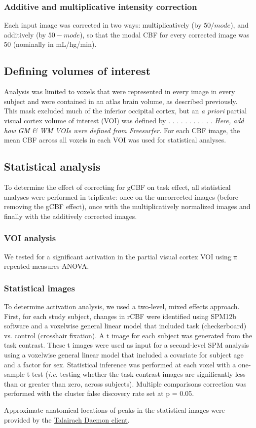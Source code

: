 \subsubsection{Additive and multiplicative intensity correction}
Each input image was corrected in two ways: multiplicatively (by $50/mode$), and additively (by $50-mode$), so that the modal CBF for every corrected image was 50 (nominally in mL/hg/min).

\subsection{Defining volumes of interest}
Analysis was limited to voxels that were represented in every image in every subject and were contained in an atlas brain volume, as described previously.\cite{Black_2010} This mask excluded much of the inferior occipital cortex, but an \textit{a priori} partial visual cortex volume of interest (VOI) was defined by . . . . . . . . . . .  \textit{Here, add how GM & WM VOIs were defined from Freesurfer.} For each CBF image, the mean CBF across all voxels in each VOI was used for statistical analyses.

\subsection{Statistical analysis}
To determine the effect of correcting for gCBF on task effect, all statistical analyses were performed in triplicate: once on the uncorrected images (before removing the gCBF effect), once with the multiplicatively normalized images and finally with the additively corrected images.

\subsubsection{VOI analysis}
We tested for a significant activation in the partial visual cortex VOI using \sout{a repeated measures ANOVA}.

\subsubsection{Statistical images}
To determine activation analysis, we used a two-level, mixed effects approach.  First, for each study subject, changes in rCBF were identified using SPM12b software and a voxelwise general linear model that included task (checkerboard) vs. control (crosshair fixation). A t image for each subject was generated from the task contrast. These t images were used as input for a second-level SPM analysis using a voxelwise general linear model that included a covariate for subject age and a factor for sex. Statistical inference was performed at each voxel with a one-sample t test (\textit{i.e.} testing whether the task contrast images are significantly less than or greater than zero, across subjects). Multiple comparisons correction was performed with the cluster false discovery rate set at p = 0.05. 

Approximate anatomical locations of peaks in the statistical images were provided by the \href{http://www.talairach.org}{Talairach Daemon client}.\cite{20408222}\cite{10912591}
